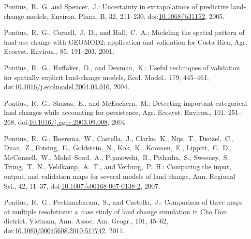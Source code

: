 \documentclass[gmdd, online, hvmath]{copernicus}
\begin{document}
\begin{thebibliography}{97}
    Pontius,~R.~G. and Spencer,~J.: Uncertainty in extrapolations of
    predictive land-change models, Environ. Plann. B, 32, 211--230,
    doi:\href{http://dx.doi.org/10.1068/b31152}{10.1068/b31152}, 2005.


   Pontius,~R.~G., Cornell,~J.~D., and
    Hall,~C.~A.: Modeling the spatial pattern of land-use change with
    {GEOMOD2:} application and validation for Costa Rica,
    Agr. Ecosyst. Environ., 85, 191--203, 2001.


   Pontius,~R.~G., Huffaker,~D., and
    Denman,~K.: Useful techniques of validation for spatially explicit
    land-change models, Ecol. Model., 179, 445--461,
    doi:\href{http://dx.doi.org/10.1016/j.ecolmodel.2004.05.010}{10.1016/j.ecolmodel.2004.05.010}, 2004{}.


   Pontius,~R.~G., Shusas,~E., and
    {McEachern},~M.: Detecting important categorical land changes
    while accounting for persistence, Agr. Ecosyst. Environ., 101,
    251--268,
doi:\href{http://dx.doi.org/10.1016/j.agee.2003.09.008}{10.1016/j.agee.2003.09.008}, 2004{}.


   Pontius,~R.~G.,
    Boersma,~W., Castella,~J., Clarke,~K., Nijs,~T., Dietzel,~C.,
    Duan,~Z., Fotsing,~E., Goldstein,~N., Kok,~K., Koomen,~E.,
    Lippitt,~C.~D., {McConnell},~W., Mohd~Sood,~A., Pijanowski,~B.,
    Pithadia,~S., Sweeney,~S., Trung,~T.~N., Veldkamp,~A.~T., and
    Verburg,~P.~H.: Comparing the input, output, and validation maps
    for several models of land change, Ann. Regional Sci., 42, 11--37,
    doi:\href{http://dx.doi.org/10.1007/s00168-007-0138-2}{10.1007/s00168-007-0138-2}, 2007.


   Pontius,~R.~G., Peethambaram,~S., and
    Castella,~J.: Comparison of three maps at multiple resolutions:
    a~case study of land change simulation in Cho Don district,
    Vietnam, Ann. Assoc. Am. Geogr., 101, 45--62,
    doi:\href{http://dx.doi.org/10.1080/00045608.2010.517742}{10.1080/00045608.2010.517742}, 2011.



\end{thebibliography}
\end{document}

